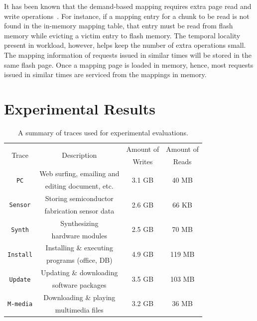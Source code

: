It has been known that the demand-based mapping requires extra page read and write operations~\cite{dftl}.
For instance,
if a mapping entry for a chunk to be read is not found in the in-memory mapping table,
that entry must be read from flash memory while evicting a victim entry to flash memory.
The temporal locality present in workload, however, helps keep the number of extra operations small.
The mapping information of requests issued in similar times will be stored in the same flash page.
Once a mapping page is loaded in memory, hence,
most requests issued in similar times are serviced from the mappings in memory.

\section{Experimental Results}

\begin{table}[t]
	\renewcommand{\tabcolsep}{1.4mm} 
	\centering
	\begin{tabular}{c|c|c|c}
		\hline
		\multirow{2}{*}{Trace} 		& \multirow{2}{*}{Description} 		& Amount of 	& Amount of \\
							   		& 			 				  		& Writes 		& Reads \\
		\hline
		\hline
		\multirow{2}{*}{\texttt{PC}} 		& Web surfing, emailing and 		& \multirow{2}{*}{3.1 GB} 	& \multirow{2}{*}{40 MB} \\
									   	   	& editing document, etc.    		& 						 	& 						  \\
		\hline
		\multirow{2}{*}{\texttt{Sensor}}    	& Storing semiconductor 		& \multirow{2}{*}{2.6 GB} 	& \multirow{2}{*}{66 KB} \\
											   	& fabrication sensor data  		& 							& 					   \\

		\hline
		\multirow{2}{*}{\texttt{Synth}} 	   	& Synthesizing 	  					& \multirow{2}{*}{2.5 GB} 	& \multirow{2}{*}{70 MB} \\
											   	& hardware modules 					&   						& 						  \\

		\hline
		\multirow{2}{*}{\texttt{Install}} 	 & Installing \& executing 			& \multirow{2}{*}{4.9 GB} 	& \multirow{2}{*}{119 MB} \\
										   	 & programs (office, DB)			& 						   	& 					   \\

		\hline
		\multirow{2}{*}{\texttt{Update}} 	 & Updating \& downloading 			& \multirow{2}{*}{3.5 GB} 	& \multirow{2}{*}{103 MB} \\
										   	 & software packages				& 						   	& 					   \\

		\hline
		\multirow{2}{*}{\texttt{M-media}} 	& Downloading \& playing 			& \multirow{2}{*}{3.2 GB} 	& \multirow{2}{*}{36 MB} \\
					 					 	& multimedia files		   			& 						 	&		   				   \\
		\hline
	\end{tabular}
	\caption{A summary of traces used for experimental evaluations.}
	\label{tab:traces}
\end{table}


